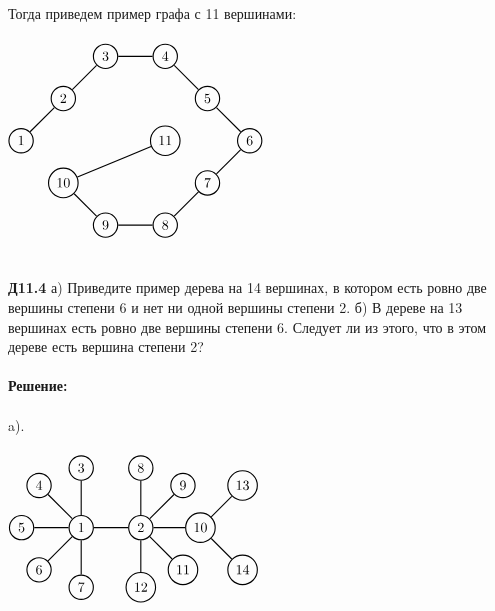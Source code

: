 \documentclass[a4paper, 12pt]{article}
\begin{document}
    \\
    \\ Тогда приведем пример графа с 11 вершинами:
    \\
    \\
    $\begin{tikzpicture}[node distance={15mm}, thick, main/.style = {draw, circle}] 
        \node[main] (1) {$1$}; 
        \node[main] (2) [above right of=1] {$2$}; 
        \node[main] (3) [above right of=2] {$3$}; 
        \node[main] (4) [right of=3] {$4$}; 
        \node[main] (5) [below right of=4] {$5$}; 
        \node[main] (6) [below right of=5] {$6$}; 
        \node[main] (7) [below left of=6] {$7$}; 
        \node[main] (8) [below left of=7] {$8$}; 
        \node[main] (9) [left of=8] {$9$}; 
        \node[main] (10) [above left of=9] {$10$};
        \node[main] (11) [above left of=7] {$11$};
        \draw[-] (1) -- (2); 
        \draw[-] (2) -- (3);
        \draw[-] (3) -- (4);
        \draw[-] (4) -- (5);
        \draw[-] (5) -- (6);
        \draw[-] (6) -- (7);
        \draw[-] (7) -- (8);
        \draw[-] (8) -- (9);
        \draw[-] (10) -- (9);
        \draw[-] (10) -- (11);
      \end{tikzpicture}$
    \\
    \\
    \\ \textbf{Д11.4} а) Приведите пример дерева на 14 вершинах, в котором есть ровно две вершины степени 6 и нет
    ни одной вершины степени 2. б) В дереве на 13 вершинах есть ровно две вершины степени 6. Следует
    ли из этого, что в этом дереве есть вершина степени 2?
    \\
    \\ \textbf{Решение: }
    \\
    \\ a).
    \\
    \\
    $\begin{tikzpicture}[node distance={15mm}, thick, main/.style = {draw, circle}] 
        \node[main] (1) {$1$}; 
        \node[main] (3) [above of=1] {$3$}; 
        \node[main] (2) [right of=1] {$2$}; 
        \node[main] (7) [below  of=1] {$7$}; 
        \node[main] (6) [below left of=1] {$6$}; 
        \node[main] (5) [left of=1] {$5$}; 
        \node[main] (4) [above left of=1] {$4$}; 
        \node[main] (8) [above of=2] {$8$};
        \node[main] (9) [above right of=2] {$9$};
        \node[main] (10) [right of=2] {$10$};
        \node[main] (11) [below right of=2] {$11$};
        \node[main] (12) [below of=2] {$12$};
        \node[main] (13) [above right of=10] {$13$};
        \node[main] (14) [below right of=10] {$14$};
        \draw[-] (1) -- (2); 
        \draw[-] (1) -- (3);
        \draw[-] (1) -- (4);
        \draw[-] (1) -- (5);
        \draw[-] (1) -- (6);
        \draw[-] (1) -- (7);
        \draw[-] (2) -- (8);
        \draw[-] (2) -- (9);
        \draw[-] (2) -- (10);
        \draw[-] (2) -- (11);
        \draw[-] (2) -- (12);
        \draw[-] (10) -- (13);
        \draw[-] (10) -- (14);     
      \end{tikzpicture}$
\end{document}
